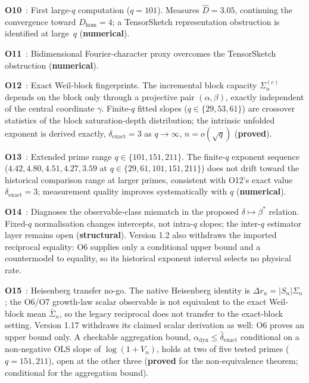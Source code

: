 \documentclass[11pt,a4paper]{article}
\newcommand{\sproved}{\textcolor{cproved}{\textbf{proved}}}
\newcommand{\sstruct}{\textcolor{cstruct}{\textbf{structural}}}
\newcommand{\snum}{\textcolor{cnum}{\textbf{numerical}}}
\begin{document}
    \textbf{O10}~\cite{Beau2026a14}: First large-$q$ computation ($q=101$).
    Measures $\hat D = 3.05$, continuing the convergence toward $D_{\mathrm{hom}} = 4$; a TensorSketch
    representation obstruction is identified at large~$q$ (\snum).

    \textbf{O11}~\cite{Beau2026a15}: Bidimensional Fourier-character proxy overcomes the
    TensorSketch obstruction (\snum).

    \textbf{O12}~\cite{Beau2026a16}: Exact Weil-block fingerprints.
    The incremental block capacity $\Sigma_n^{(c)}$ depends on the block only through a
    projective pair $(\alpha,\beta)$, exactly independent of the central coordinate $\gamma$.
    Finite-$q$ fitted slopes ($q\in\{29,53,61\}$) are crossover statistics of the block
    saturation-depth distribution; the intrinsic unfolded exponent is derived exactly,
    $\delta_{\mathrm{exact}} = 3$ as $q\to\infty$, $n=o(\sqrt q)$ (\sproved).

    \textbf{O13}~\cite{Beau2026a17}: Extended prime range $q \in \{101, 151, 211\}$.
    The finite-$q$ exponent sequence ($4.42,4.80,4.51,4.27,3.59$ at $q\in\{29,61,101,151,211\}$)
    does not drift toward the historical comparison range at larger primes, consistent with O12's
    exact value $\delta_{\mathrm{exact}}=3$; measurement quality improves systematically with
    $q$ (\snum).

    \textbf{O14}~\cite{Beau2026a18}: Diagnoses the observable-class mismatch in the proposed
    $\delta \mapsto \beta^*$ relation.  Fixed-$q$ normalisation changes intercepts, not
    intra-$q$ slopes; the inter-$q$ estimator layer remains open (\sstruct).
    Version 1.2 also withdraws the imported reciprocal equality: O6 supplies only a conditional upper bound
    and a countermodel to equality, so its historical exponent interval selects no physical rate.

    \textbf{O15}~\cite{Beau2026a19}: Heisenberg transfer no-go.
    The native Heisenberg identity is $\Delta r_n=|S_n|\Sigma_n$; the O6/O7 growth-law scalar
    observable is not equivalent to the exact Weil-block mean $\bar\Sigma_n$, so
    the legacy reciprocal does not transfer to the exact-block setting.
    Version 1.17 withdraws its claimed scalar derivation as well: O6 proves an upper bound only.
    A checkable aggregation bound, $\alpha_{\mathrm{dyn}}\leq\hat\delta_{\mathrm{exact}}$
    conditional on a non-negative OLS slope of $\log(1+V_n)$, holds at two of five tested
    primes ($q=151,211$), open at the other three (\sproved{} for the non-equivalence theorem;
    conditional for the aggregation bound).
\end{document}
